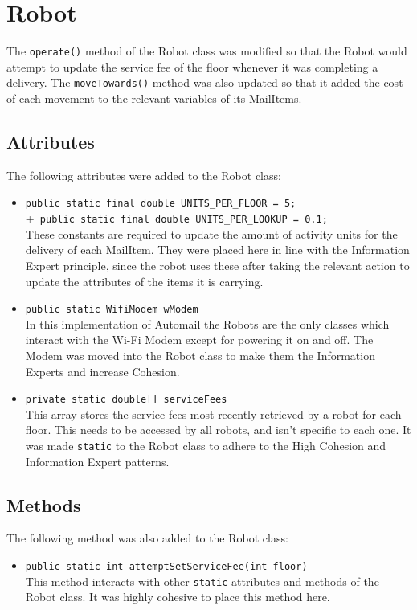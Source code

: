 \documentclass{article}
\begin{document}
\section{Robot}
The \verb|operate()| method of the Robot class was modified so that the Robot would attempt to update the service fee of the floor whenever it was completing a delivery. The \verb|moveTowards()| method was also updated so that it added the cost of each movement to the relevant variables of its MailItems.
\subsection{Attributes}
\label{sec: robot attrs}
The following attributes were added to the Robot class:
\begin{itemize}
    \item \verb|public static final double UNITS_PER_FLOOR = 5;|\\
         +\verb| public static final double UNITS_PER_LOOKUP = 0.1;|\\[2mm]
    These constants are required to update the amount of activity units for the delivery of each MailItem. They were placed here in line with the Information Expert principle, since the robot uses these after taking the relevant action to update the attributes of the items it is carrying.
    \item \verb|public static WifiModem wModem|\\[2mm]
    In this implementation of Automail the Robots are the only classes which interact with the Wi-Fi Modem except for powering it on and off. The Modem was moved into the Robot class to make them the Information Experts and increase Cohesion.
    \item \verb|private static double[] serviceFees|\\[2mm]
    This array stores the service fees most recently retrieved by a robot for each floor. This needs to be accessed by all robots, and isn't specific to each one. It was made \verb|static| to the Robot class to adhere to the High Cohesion and Information Expert patterns.
\end{itemize}
\subsection{Methods}
The following method was also added to the Robot class:
\begin{itemize}
    \item \verb|public static int attemptSetServiceFee(int floor)|\\[2mm]
    This method interacts with other \verb|static| attributes and methods of the Robot class. It was highly cohesive to place this method here.
\end{itemize}
\end{document}
